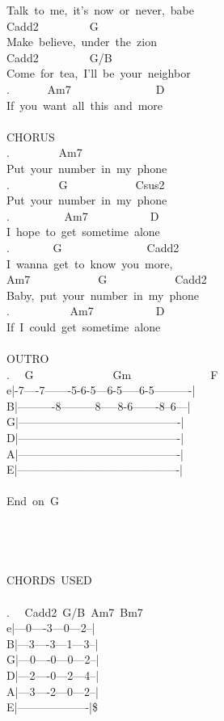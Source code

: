 {Talk\ to\ me,\ it's\ now\ or\ never,\ babe\\
Cadd2\ \ \ \ \ \ \ \ \ G\\
Make\ believe,\ under\ the\ zion\\
Cadd2\ \ \ \ \ \ \ \ \ G/B\\
Come\ for\ tea,\ I'll\ be\ your\ neighbor\\
. \ \ \ \ \ \ Am7\ \ \ \ \ \ \ \ \ \ \ \ \ \ \ D\\
If\ you\ want\ all\ this\ and\ more\\
\\
CHORUS\\
. \ \ \ \ \ \ \ \ Am7\\
Put\ your\ number\ in\ my\ phone\\
. \ \ \ \ \ \ \ \ G\ \ \ \ \ \ \ \ \ \ \ \ Csus2\\
Put\ your\ number\ in\ my\ phone\\
. \ \ \ \ \ \ \ \ \ Am7\ \ \ \ \ \ \ \ \ \ \ D\\
I\ hope\ to\ get\ sometime\ alone\\
. \ \ \ \ \ \ \ G\ \ \ \ \ \ \ \ \ \ \ \ \ \ \ Cadd2\\
I\ wanna\ get\ to\ know\ you\ more,\ \\
Am7\ \ \ \ \ \ \ \ \ \ \ \ G\ \ \ \ \ \ \ \ \ \ \ \ Cadd2\\
Baby,\ put\ your\ number\ in\ my\ phone\\
. \ \ \ \ \ \ \ \ \ \ Am7\ \ \ \ \ \ \ \ \ \ \ D\\
If\ I\ could\ get\ sometime\ alone\\
\\
OUTRO\\
. \ \ G\ \ \ \ \ \ \ \ \ \ \ \ \ \ Gm\ \ \ \ \ \ \ \ \ \ \ \ \ \ F\\
e|-7----7-------5-6-5---6-5-----6-5----------|\\
B|----------8---------8-----8-6-------8--6---|\\
G|-------------------------------------------|\\
D|-------------------------------------------|\\
A|-------------------------------------------|\\
E|-------------------------------------------|\\
\\
End\ on\ G\\
\\
\\
\\
\\
CHORDS\ USED\\
\\
. \ \ Cadd2\ G/B\ Am7\ Bm7\\
e|---0----3---0---2--|\\
B|---3----3---1---3--|\\
G|---0----0---0---2--|\\
D|---2----0---2---4--|\\
A|---3----2---0---2--|\\
E|-------------------|\$}

